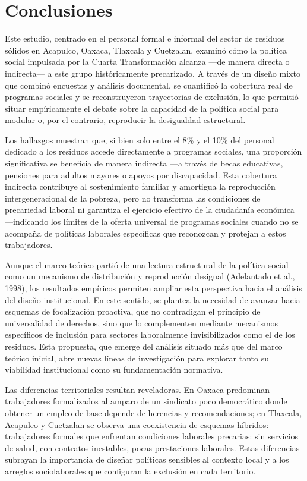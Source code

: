 \documentclass[
  spanish,
  11pt,
  a4paper,
]{scrbook}
\begin{document}
\endgroup

\section*{Conclusiones}\label{conclusiones}


Este estudio, centrado en el personal formal e informal del sector de
residuos sólidos en Acapulco, Oaxaca, Tlaxcala y Cuetzalan, examinó cómo
la política social impulsada por la Cuarta Transformación alcanza ---de
manera directa o indirecta--- a este grupo históricamente precarizado. A
través de un diseño mixto que combinó encuestas y análisis documental,
se cuantificó la cobertura real de programas sociales y se
reconstruyeron trayectorias de exclusión, lo que permitió situar
empíricamente el debate sobre la capacidad de la política social para
modular o, por el contrario, reproducir la desigualdad estructural.

Los hallazgos muestran que, si bien solo entre el 8\% y el 10\% del
personal dedicado a los residuos accede directamente a programas
sociales, una proporción significativa se beneficia de manera indirecta
---a través de becas educativas, pensiones para adultos mayores o apoyos
por discapacidad. Esta cobertura indirecta contribuye al sostenimiento
familiar y amortigua la reproducción intergeneracional de la pobreza,
pero no transforma las condiciones de precariedad laboral ni garantiza
el ejercicio efectivo de la ciudadanía económica ---indicando los
límites de la oferta universal de programas sociales cuando no se
acompaña de políticas laborales específicas que reconozcan y protejan a
estos trabajadores.

Aunque el marco teórico partió de una lectura estructural de la política
social como un mecanismo de distribución y reproducción desigual
(Adelantado et al., 1998), los resultados empíricos permiten ampliar
esta perspectiva hacia el análisis del diseño institucional. En este
sentido, se plantea la necesidad de avanzar hacia esquemas de
focalización proactiva, que no contradigan el principio de universalidad
de derechos, sino que lo complementen mediante mecanismos específicos de
inclusión para sectores laboralmente invisibilizados como el de los
residuos. Esta propuesta, que emerge del análisis situado más que del
marco teórico inicial, abre nuevas líneas de investigación para explorar
tanto su viabilidad institucional como su fundamentación normativa.

Las diferencias territoriales resultan reveladoras. En Oaxaca predominan
trabajadores formalizados al amparo de un sindicato poco democrático
donde obtener un empleo de base depende de herencias y recomendaciones;
en Tlaxcala, Acapulco y Cuetzalan se observa una coexistencia de
esquemas híbridos: trabajadores formales que enfrentan condiciones
laborales precarias: sin servicios de salud, con contratos inestables,
pocas prestaciones laborales. Estas diferencias subrayan la importancia
de diseñar políticas sensibles al contexto local y a los arreglos
sociolaborales que configuran la exclusión en cada territorio.
\end{document}
